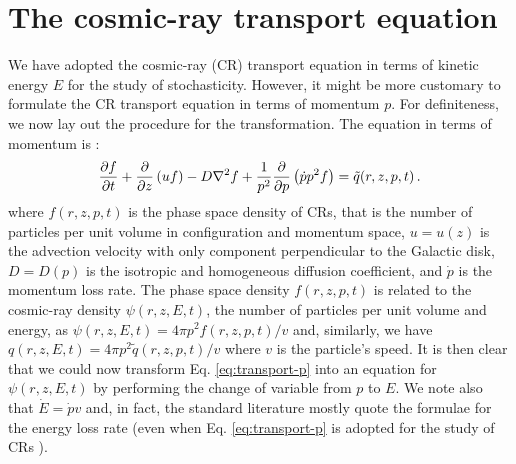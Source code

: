 
%
%
%
%
%
%
%
%
%

\section*{The cosmic-ray transport equation}
We have adopted the cosmic-ray (CR) transport equation in terms of kinetic energy $E$ for the study of stochasticity. However, it might be more customary to formulate the CR transport equation in terms of momentum $p$. For definiteness, we now lay out the procedure for the transformation. The equation in terms of momentum is \cite{schlickeiser2002}:  
\begin{equation}
\frac{\partial f}{\partial t}+\frac{\partial}{\partial z}\left(u f\right) -D\nabla^2 f + \frac{1}{p^2} \frac{\partial }{\partial p}\left(\dot{p}p^2f\right)=\Tilde{q}(r, z, p, t) \, . \label{eq:transport-p}
\end{equation}
where $f(r,z,p,t)$ is the phase space density of CRs, that is the number of particles per unit volume in configuration and momentum space, $u=u(z)$ is the advection velocity with only component perpendicular to the Galactic disk, $D=D(p)$ is the isotropic and homogeneous diffusion coefficient, and $\dot{p}$ is the momentum loss rate. The phase space density $f(r,z,p,t)$ is related to the cosmic-ray density $\psi(r,z,E,t)$, the number of particles per unit volume and energy, as $\psi(r,z,E,t)=4\pi p^2 f(r,z,p,t)/v$ and, similarly, we have $q(r,z,E,t)=4\pi p^2 \tilde{q}(r,z,p,t)/v$ where $v$ is the particle's speed. It is then clear that we could now transform Eq. \ref{eq:transport-p} into an equation for $\psi(r,z,E,t)$ by performing the change of variable from $p$ to $E$. We note also that $\dot{E}=\dot{p}v$ and, in fact, the standard literature mostly quote the formulae for the energy loss rate (even when Eq. \ref{eq:transport-p} is adopted for the study of CRs \cite{strong1998,schlickeiser2002}).

